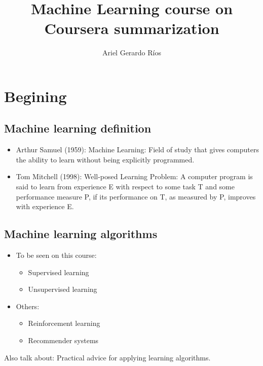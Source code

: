 \documentclass[a4paper]{report}
\begin{document}
  \title{Machine Learning course on Coursera summarization}
  \author{Ariel Gerardo Ríos}
  \date{}
  \maketitle

  \tableofcontents

  \chapter{Begining}

    \section{Machine learning definition}
  
        \begin{itemize}
        \item Arthur Samuel (1959): Machine Learning: Field of study that gives
              computers the ability to learn without being explicitly
              programmed.
        \item Tom Mitchell (1998): Well-posed Learning Problem: A computer
              program is said to learn from experience E with respect to some
              task T and some performance measure P, if its performance on T,
              as measured by P, improves with experience E.
      \end{itemize}

    \section{Machine learning algorithms}
      \begin{itemize}
        \item To be seen on this course:
              \begin{itemize}
                \item Supervised learning
                \item Unsupervised learning
              \end{itemize}
        \item Others:
              \begin{itemize}
                \item Reinforcement learning
                \item Recommender systems
              \end{itemize}
      \end{itemize}
      Also talk about: Practical advice for applying learning algorithms.
\end{document}
